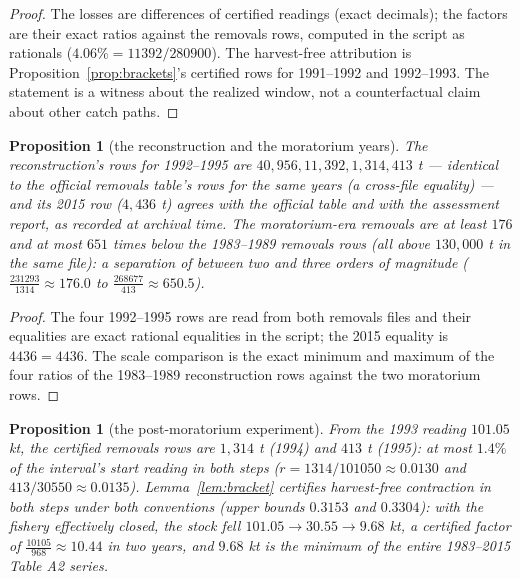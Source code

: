 \documentclass[10pt,twocolumn]{article}
\theoremstyle{plain}
\newtheorem{proposition}[theorem]{Proposition}
\theoremstyle{remark}
\begin{document}
\begin{proof}
The losses are differences of certified readings (exact decimals);
the factors are their exact ratios against the removals rows, computed
in the script as rationals (\(4.06\% = 11392/280900\)). The
harvest-free attribution is Proposition~\ref{prop:brackets}'s
certified rows for 1991--1992 and 1992--1993. The statement is a
witness about the realized window, not a counterfactual claim about
other catch paths.
\end{proof}

\begin{proposition}[the reconstruction and the moratorium years]
\label{prop:catchrecord}
The reconstruction's rows for 1992--1995 are
\(40{,}956, 11{,}392, 1{,}314, 413\) t --- identical to the official
removals table's rows for the same years (a cross-file equality) --- and
its 2015 row (\(4{,}436\) t) agrees with the official table and with
the assessment report, as recorded at archival time. The
moratorium-era removals are at least \(176\) and at most \(651\)
times below the 1983--1989 removals rows (all above \(130{,}000\) t in
the same file): a separation of between two and three orders of
magnitude (\(\tfrac{231293}{1314} \approx 176.0\) to
\(\tfrac{268677}{413} \approx 650.5\)).
\end{proposition}

\begin{proof}
The four 1992--1995 rows are read from both removals files and their
equalities are exact rational equalities in the script; the 2015
equality is \(4436 = 4436\). The scale comparison is the exact minimum
and maximum of the four ratios of the 1983--1989 reconstruction rows
against the two moratorium rows.
\end{proof}

\begin{proposition}[the post-moratorium experiment]
\label{prop:experiment}
From the 1993 reading \(101.05\) kt, the certified removals rows are
\(1{,}314\) t (1994) and \(413\) t (1995): at most \(1.4\%\) of the
interval's start reading in both steps (\(r = 1314/101050 \approx
0.0130\) and \(413/30550 \approx 0.0135\)). Lemma~\ref{lem:bracket}
certifies harvest-free contraction in both steps under both conventions
(upper bounds \(0.3153\) and \(0.3304\)): with the fishery effectively
closed, the stock fell \(101.05 \to 30.55 \to 9.68\) kt, a certified
factor of \(\tfrac{10105}{968} \approx 10.44\) in two years, and
\(9.68\) kt is the minimum of the entire 1983--2015 Table A2 series.
\end{proposition}
\end{document}
